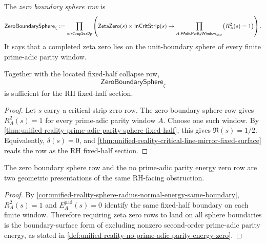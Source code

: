 \begin{definition}
\label{def:unified-reality-zero-boundary-sphere-row}
The \emph{zero boundary sphere row} is
$$
\mathsf{ZeroBoundarySphere}_{\zeta}
:=
\prod_{s:\ComplexUp}
\left(
\mathsf{ZetaZero}(s)
\times
\mathsf{InCritStrip}(s)
\to
\prod_{A:\mathsf{PAdicParityWindow}_{\ne\varnothing}}
\bigl(R_A^2(s)=1\bigr)
\right).
$$
It says that a completed zeta zero lies on the unit-boundary sphere of
every finite prime-adic parity window.
\end{definition}

\begin{theorem}
\label{thm:unified-reality-zero-boundary-sphere-conditionally-sufficient}
Together with the located fixed-half collapse row,
$$
\mathsf{ZeroBoundarySphere}_{\zeta}
$$
is sufficient for the RH fixed-half section.
\end{theorem}

\begin{proof}
Let $s$ carry a critical-strip zero row.  The zero boundary sphere row
gives $R_A^2(s)=1$ for every prime-adic parity window $A$.  Choose one
such window.  By
\autoref{thm:unified-reality-prime-adic-parity-sphere-fixed-half},
this gives $\Re(s)=1/2$.  Equivalently, $\delta(s)=0$, and
\autoref{thm:unified-reality-critical-line-mirror-fixed-surface} reads
the row as the RH fixed-half section.
\end{proof}

\begin{corollary}
\label{cor:unified-reality-sphere-boundary-geometric-energy-refusal}
The zero boundary sphere row and the no prime-adic parity energy zero row
are two geometric presentations of the same RH-facing obstruction.
\end{corollary}

\begin{proof}
By
\autoref{cor:unified-reality-sphere-radius-normal-energy-same-boundary},
$R_A^2(s)=1$ and $E_A^{\mathrm{pad}}(s)=0$ identify the same fixed-half
boundary on each finite window.  Therefore requiring zeta zero rows to
land on all sphere boundaries is the boundary-surface form of excluding
nonzero second-order prime-adic parity energy, as stated in
\autoref{def:unified-reality-no-prime-adic-parity-energy-zero}.
\end{proof}
